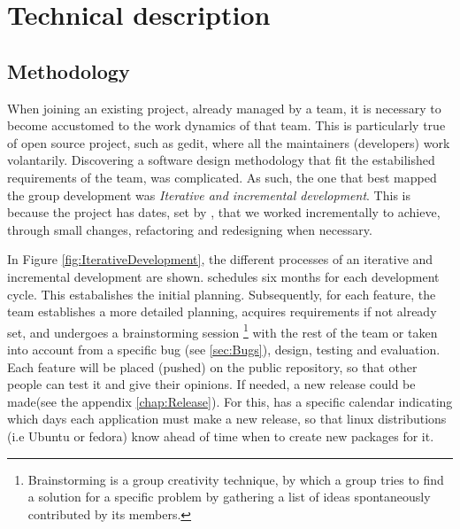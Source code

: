 \chapter{Technical description}


\section{Methodology}\label{sec:Methodology}

When joining an existing project, already managed by a team, it is necessary to become accustomed to the work dynamics of that 
team. This is particularly true of open source project, such as gedit, where all the maintainers (developers) work 
volantarily.  Discovering a software design methodology that fit the estabilished requirements of the team, 
was complicated.  As such, the one that best mapped the group development was  \emph{Iterative and incremental development}. 
This is because the project has dates, set by \GNOME, that we worked incrementally to achieve, through 
small changes, refactoring and redesigning when necessary.  



In Figure \ref{fig:IterativeDevelopment}, the different processes of an iterative and incremental 
development are shown.  \GNOME schedules six months for each development cycle. This estabalishes the initial planning. 
Subsequently, for each feature, the team establishes a more detailed planning, acquires requirements if not already set, 
and undergoes a brainstorming session \footnote{Brainstorming is a group creativity technique, by which a group tries to find a 
solution for a specific problem by gathering a list of ideas spontaneously contributed by its members.} with the 
rest of the team or taken into account from a specific bug (see \ref{sec:Bugs}), design, testing and evaluation. 
Each feature will be placed (pushed) on the public repository,  so that other people can test it and give their opinions. 
If needed, a new release could be made(see the appendix \ref{chap:Release}).  For this, \GNOME has a specific calendar indicating 
which days each application must make a new release, so that linux distributions (i.e Ubuntu or fedora) 
know ahead of time when to create new packages for it.

